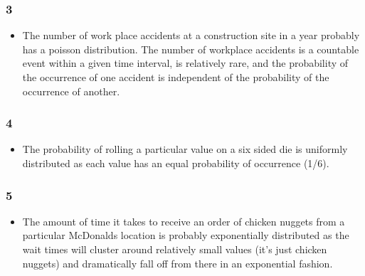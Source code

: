 \documentclass[
]{article}
\providecommand{\tightlist}{%
  \setlength{\itemsep}{0pt}\setlength{\parskip}{0pt}}
\begin{document}
\hypertarget{section-9}{%
\subsubsection{3}\label{section-9}}

\begin{itemize}
\tightlist
\item
  The number of work place accidents at a construction site in a year
  probably has a poisson distribution. The number of workplace accidents
  is a countable event within a given time interval, is relatively rare,
  and the probability of the occurrence of one accident is independent
  of the probability of the occurrence of another.
\end{itemize}

\hypertarget{section-10}{%
\subsubsection{4}\label{section-10}}

\begin{itemize}
\tightlist
\item
  The probability of rolling a particular value on a six sided die is
  uniformly distributed as each value has an equal probability of
  occurrence (1/6).
\end{itemize}

\hypertarget{section-11}{%
\subsubsection{5}\label{section-11}}

\begin{itemize}
\tightlist
\item
  The amount of time it takes to receive an order of chicken nuggets
  from a particular McDonalds location is probably exponentially
  distributed as the wait times will cluster around relatively small
  values (it's just chicken nuggets) and dramatically fall off from
  there in an exponential fashion.
\end{itemize}
\end{document}
